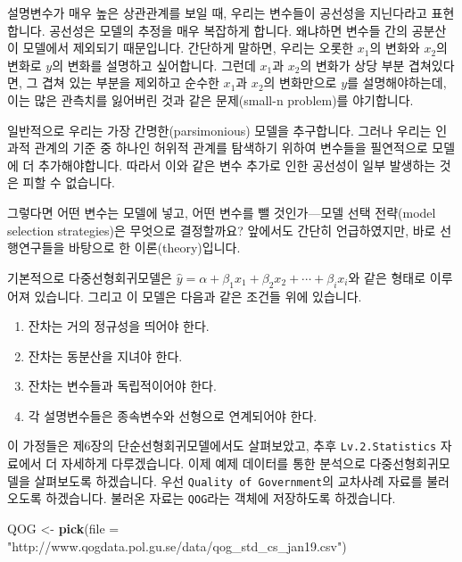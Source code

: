 \documentclass[]{book}
\newenvironment{Shaded}{\begin{snugshade}}{\end{snugshade}}
\newcommand{\DataTypeTok}[1]{\textcolor[rgb]{0.13,0.29,0.53}{#1}}
\newcommand{\KeywordTok}[1]{\textcolor[rgb]{0.13,0.29,0.53}{\textbf{#1}}}
\newcommand{\NormalTok}[1]{#1}
\newcommand{\StringTok}[1]{\textcolor[rgb]{0.31,0.60,0.02}{#1}}
\providecommand{\tightlist}{%
  \setlength{\itemsep}{0pt}\setlength{\parskip}{0pt}}
\begin{document}
설명변수가 매우 높은 상관관계를 보일 때, 우리는 변수들이 공선성을 지닌다라고 표현합니다. 공선성은 모델의 추정을 매우 복잡하게 합니다. 왜냐하면 변수들 간의 공분산이 모델에서 제외되기 때문입니다. 간단하게 말하면, 우리는 오롯한 \(x_1\)의 변화와 \(x_2\)의 변화로 \(y\)의 변화를 설명하고 싶어합니다. 그런데 \(x_1\)과 \(x_2\)의 변화가 상당 부분 겹쳐있다면, 그 겹쳐 있는 부분을 제외하고 순수한 \(x_1\)과 \(x_2\)의 변화만으로 \(y\)를 설명해야하는데, 이는 많은 관측치를 잃어버린 것과 같은 문제(small-n problem)를 야기합니다.

일반적으로 우리는 가장 간명한(parsimonious) 모델을 추구합니다. 그러나 우리는 인과적 관계의 기준 중 하나인 허위적 관계를 탐색하기 위하여 변수들을 필연적으로 모델에 더 추가해야합니다. 따라서 이와 같은 변수 추가로 인한 공선성이 일부 발생하는 것은 피할 수 없습니다.

그렇다면 어떤 변수는 모델에 넣고, 어떤 변수를 뺄 것인가---모델 선택 전략(model selection strategies)은 무엇으로 결정할까요? 앞에서도 간단히 언급하였지만, 바로 선행연구들을 바탕으로 한 이론(theory)입니다.

기본적으로 다중선형회귀모델은 \(\hat{y} = \alpha + \beta_1x_1 + \beta_2x_2 + \cdots + \beta_ix_i\)와 같은 형태로 이루어져 있습니다. 그리고 이 모델은 다음과 같은 조건들 위에 있습니다.

\begin{enumerate}
\def\labelenumi{\arabic{enumi}.}
\tightlist
\item
  잔차는 거의 정규성을 띄어야 한다.
\item
  잔차는 동분산을 지녀야 한다.
\item
  잔차는 변수들과 독립적이어야 한다.
\item
  각 설명변수들은 종속변수와 선형으로 연계되어야 한다.
\end{enumerate}

이 가정들은 제6장의 단순선형회귀모델에서도 살펴보았고, 추후 \texttt{Lv.2.Statistics} 자료에서 더 자세하게 다루겠습니다. 이제 예제 데이터를 통한 분석으로 다중선형회귀모델을 살펴보도록 하겠습니다. 우선 \texttt{Quality\ of\ Government}의 교차사례 자료를 불러오도록 하겠습니다. 불러온 자료는 \texttt{QOG}라는 객체에 저장하도록 하겠습니다.

\begin{Shaded}
\begin{Highlighting}[]
\NormalTok{QOG <-}\StringTok{ }\KeywordTok{pick}\NormalTok{(}\DataTypeTok{file =} \StringTok{"http://www.qogdata.pol.gu.se/data/qog_std_cs_jan19.csv"}\NormalTok{)}
\end{Highlighting}
\end{Shaded}
\end{document}
